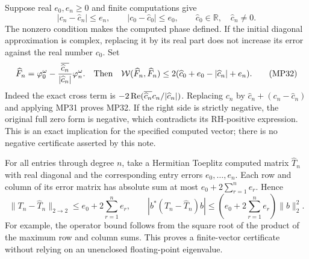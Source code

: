 \documentclass[11pt]{article}
\begin{document}
Suppose real $e_0,e_n\geq0$ and finite computations give
\begin{equation}
 |c_n-\widehat c_n|\leq e_n,\qquad
 |c_0-\widehat c_0|\leq e_0,\qquad
 \widehat c_0\in\mathbb R,\quad \widehat c_n\ne0.
 \tag{MP31}
\end{equation}
The nonzero condition makes the computed phase defined. If the initial
diagonal approximation is complex, replacing it by its real part does
not increase its error against the real number $c_0$.
Set
\begin{equation}
 \widehat F_n=\varphi_0^\omega-
                 \frac{\overline{\widehat c_n}}{|\widehat c_n|}
                      \varphi_n^\omega.
 \quad\text{Then}\quad
 \mathcal W(\widehat F_n,\widehat F_n)
 \leq2(\widehat c_0+e_0-|\widehat c_n|+e_n).
 \tag{MP32}
\end{equation}
Indeed the exact cross term is
$-2\operatorname{Re}(\overline{\widehat c_n}c_n/|\widehat c_n|)$.
Replacing $c_n$ by $\widehat c_n+(c_n-\widehat c_n)$ and applying
MP31 proves MP32. If the right side is strictly negative, the original
full zero form is negative, which contradicts its RH-positive expression.
This is an exact implication for the specified computed vector; there
is no negative certificate asserted by this note.

For all entries through degree $n$, take a Hermitian Toeplitz computed
matrix $\widehat T_n$ with real diagonal and the corresponding entry
errors $e_0,\ldots,e_n$. Each row and column of its error matrix has
absolute sum at most $e_0+2\sum_{r=1}^n e_r$. Hence
\begin{equation}
 \|T_n-\widehat T_n\|_{2\to2}
       \leq e_0+2\sum_{r=1}^n e_r,\qquad
 |b^*(T_n-\widehat T_n)b|
       \leq\left(e_0+2\sum_{r=1}^n e_r\right)\|b\|_2^2.
 \tag{MP33}
\end{equation}
For example, the operator bound follows from the square root of the
product of the maximum row and column sums. This proves a finite-vector
certificate without relying on an unenclosed floating-point eigenvalue.
\end{document}
